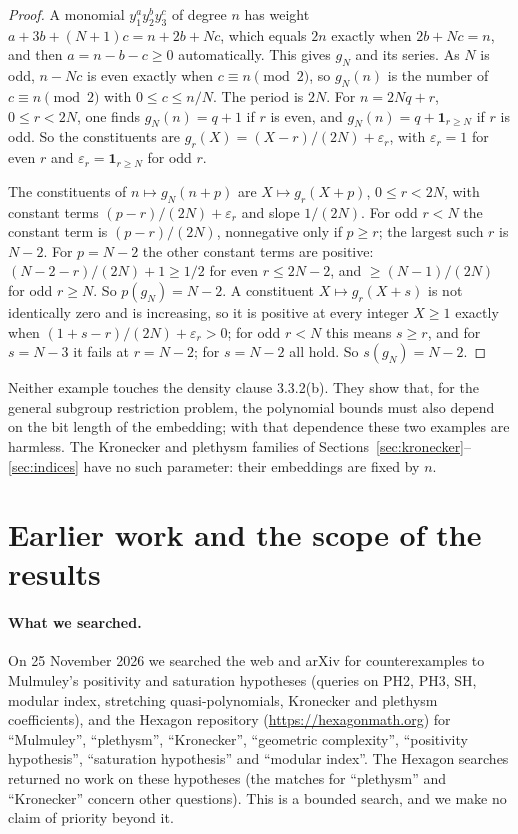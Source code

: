 \begin{proof}
A monomial $y_1^ay_2^by_3^c$ of degree $n$ has weight $a+3b+(N+1)c=n+2b+Nc$,
which equals $2n$ exactly when $2b+Nc=n$, and then $a=n-b-c\ge0$ automatically.
This gives $g_N$ and its series. As $N$ is odd, $n-Nc$ is even exactly when
$c\equiv n\pmod2$, so $g_N(n)$ is the number of $c\equiv n\pmod2$ with
$0\le c\le n/N$. The period is $2N$. For $n=2Nq+r$, $0\le r<2N$, one finds
$g_N(n)=q+1$ if $r$ is even, and $g_N(n)=q+\mathbf1_{r\ge N}$ if $r$ is odd. So
the constituents are $g_r(X)=(X-r)/(2N)+\varepsilon_r$, with $\varepsilon_r=1$
for even $r$ and $\varepsilon_r=\mathbf1_{r\ge N}$ for odd $r$.

The constituents of $n\mapsto g_N(n+p)$ are $X\mapsto g_r(X+p)$, $0\le r<2N$,
with constant terms $(p-r)/(2N)+\varepsilon_r$ and slope $1/(2N)$. For odd
$r<N$ the constant term is $(p-r)/(2N)$, nonnegative only if $p\ge r$; the
largest such $r$ is $N-2$. For $p=N-2$ the other constant terms are positive:
$(N-2-r)/(2N)+1\ge1/2$ for even $r\le2N-2$, and $\ge(N-1)/(2N)$ for odd
$r\ge N$. So $p(g_N)=N-2$. A constituent $X\mapsto g_r(X+s)$ is not
identically zero and is increasing, so it is positive at every integer $X\ge1$
exactly when $(1+s-r)/(2N)+\varepsilon_r>0$; for odd $r<N$ this means $s\ge r$,
and for $s=N-3$ it fails at $r=N-2$; for $s=N-2$ all hold. So $s(g_N)=N-2$.
\end{proof}

Neither example touches the density clause 3.3.2(b). They show that, for the
general subgroup restriction problem, the polynomial bounds must also depend on
the bit length of the embedding; with that dependence these two examples are
harmless. The Kronecker and plethysm families of
Sections~\ref{sec:kronecker}--\ref{sec:indices} have no such parameter: their
embeddings are fixed by $n$.

\section{Earlier work and the scope of the results}\label{sec:literature}

\paragraph{What we searched.}
On 25 November 2026 we searched the web and arXiv for counterexamples to
Mulmuley's positivity and saturation hypotheses (queries on PH2, PH3, SH,
modular index, stretching quasi-polynomials, Kronecker and plethysm
coefficients), and the Hexagon repository (\url{https://hexagonmath.org}) for
``Mulmuley'', ``plethysm'', ``Kronecker'', ``geometric complexity'',
``positivity hypothesis'', ``saturation hypothesis'' and ``modular index''. The
Hexagon searches returned no work on these hypotheses (the matches for
``plethysm'' and ``Kronecker'' concern other questions). This is a bounded
search, and we make no claim of priority beyond it.

